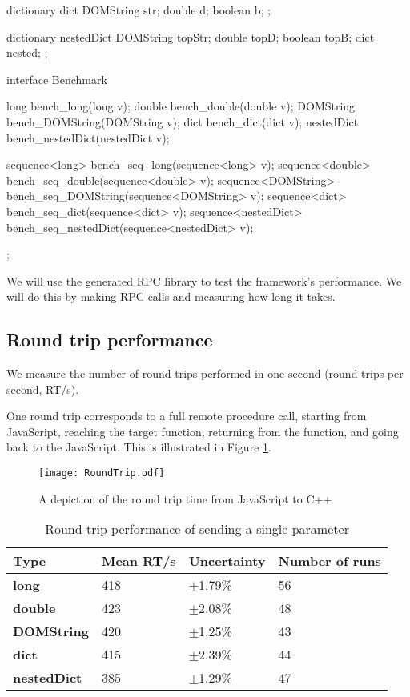 \begin{code}
dictionary dict {
  DOMString str;
  double d;
  boolean b;
};

dictionary nestedDict {
  DOMString topStr;
  double topD;
  boolean topB;
  dict nested;
};

interface Benchmark{
  long bench_long(long v);
  double bench_double(double v);
  DOMString bench_DOMString(DOMString v);
  dict bench_dict(dict v);
  nestedDict bench_nestedDict(nestedDict v);

  sequence<long> bench_seq_long(sequence<long> v);
  sequence<double> bench_seq_double(sequence<double> v);
  sequence<DOMString> bench_seq_DOMString(sequence<DOMString> v);
  sequence<dict> bench_seq_dict(sequence<dict> v);
  sequence<nestedDict> bench_seq_nestedDict(sequence<nestedDict> v);
};
\end{code}

We will use the generated RPC library to test the framework's performance. We will do this by making RPC calls and measuring how long it takes.

\subsection{Round trip performance}\label{round-trip-performance}

We measure the number of round trips performed in one second (round trips per second, RT/s).

One round trip corresponds to a full remote procedure call, starting from JavaScript, reaching the target function, returning from the function, and going back to the JavaScript. This is illustrated in Figure \ref{fig:rpc_roundtrip}.


\begin{figure}
    \centering
    \texttt{[image: RoundTrip.pdf]} 
    \caption{A depiction of the round trip time from JavaScript to C++}
    \label{fig:rpc_roundtrip}
\end{figure}


\begin{table}[h]
\centering
\begin{tabular}{l|lll}
\textbf{Type}       & \textbf{Mean RT/s} & \textbf{Uncertainty} & \textbf{Number of runs} \\ \hline
\textbf{long}       & 418                & $\pm$1.79\%              & 56                      \\
\textbf{double}     & 423                & $\pm$2.08\%              & 48                      \\
\textbf{DOMString}  & 420                & $\pm$1.25\%              & 43                      \\
\textbf{dict}       & 415                & $\pm$2.39\%              & 44                      \\
\textbf{nestedDict} & 385                & $\pm$1.29\%              & 47                     
\end{tabular}
\caption{Round trip performance of sending a single parameter}
\label{table:roundtrip_single_param}
\end{table}


